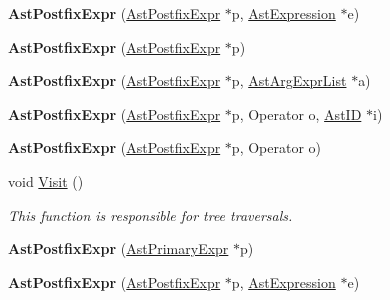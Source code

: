 \begin{DoxyCompactItemize}
\item 
\hypertarget{classAstPostfixExpr_a5dd762cbae8160f94a661ecdf3a90770}{{\bfseries Ast\-Postfix\-Expr} (\hyperlink{classAstPostfixExpr}{Ast\-Postfix\-Expr} $\ast$p, \hyperlink{classAstExpression}{Ast\-Expression} $\ast$e)}\label{classAstPostfixExpr_a5dd762cbae8160f94a661ecdf3a90770}

\item 
\hypertarget{classAstPostfixExpr_af17b325f38a7138728773d86a9342105}{{\bfseries Ast\-Postfix\-Expr} (\hyperlink{classAstPostfixExpr}{Ast\-Postfix\-Expr} $\ast$p)}\label{classAstPostfixExpr_af17b325f38a7138728773d86a9342105}

\item 
\hypertarget{classAstPostfixExpr_a4a1ae7a03b7b29e6641f47479e58aa3b}{{\bfseries Ast\-Postfix\-Expr} (\hyperlink{classAstPostfixExpr}{Ast\-Postfix\-Expr} $\ast$p, \hyperlink{classAstArgExprList}{Ast\-Arg\-Expr\-List} $\ast$a)}\label{classAstPostfixExpr_a4a1ae7a03b7b29e6641f47479e58aa3b}

\item 
\hypertarget{classAstPostfixExpr_a094735e6e2f593a42cc2b9aabc44213b}{{\bfseries Ast\-Postfix\-Expr} (\hyperlink{classAstPostfixExpr}{Ast\-Postfix\-Expr} $\ast$p, Operator o, \hyperlink{classAstID}{Ast\-I\-D} $\ast$i)}\label{classAstPostfixExpr_a094735e6e2f593a42cc2b9aabc44213b}

\item 
\hypertarget{classAstPostfixExpr_a71f3baa5264259031d95741e65de1e07}{{\bfseries Ast\-Postfix\-Expr} (\hyperlink{classAstPostfixExpr}{Ast\-Postfix\-Expr} $\ast$p, Operator o)}\label{classAstPostfixExpr_a71f3baa5264259031d95741e65de1e07}

\item 
void \hyperlink{classAstPostfixExpr_ae3e7fdbd4c2bf888ee62760e6f422cad}{Visit} ()
\begin{DoxyCompactList}\small\item\em This function is responsible for tree traversals. \end{DoxyCompactList}\item 
\hypertarget{classAstPostfixExpr_a8299517f87239b0428545cdfc96f0bbc}{{\bfseries Ast\-Postfix\-Expr} (\hyperlink{classAstPrimaryExpr}{Ast\-Primary\-Expr} $\ast$p)}\label{classAstPostfixExpr_a8299517f87239b0428545cdfc96f0bbc}

\item 
\hypertarget{classAstPostfixExpr_a5dd762cbae8160f94a661ecdf3a90770}{{\bfseries Ast\-Postfix\-Expr} (\hyperlink{classAstPostfixExpr}{Ast\-Postfix\-Expr} $\ast$p, \hyperlink{classAstExpression}{Ast\-Expression} $\ast$e)}\label{classAstPostfixExpr_a5dd762cbae8160f94a661ecdf3a90770}


\end{DoxyCompactItemize}
